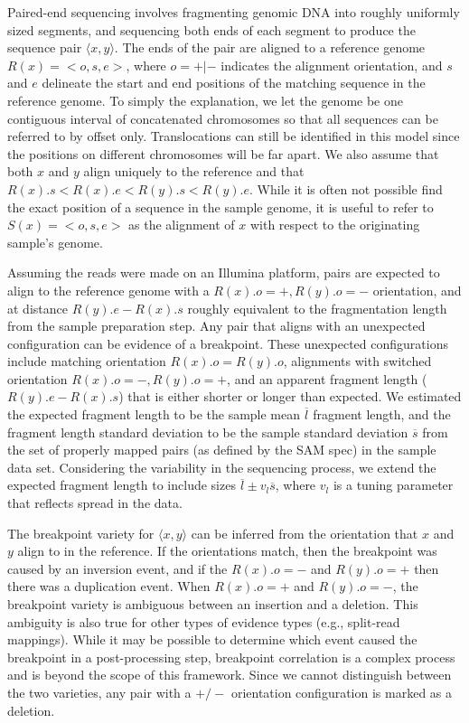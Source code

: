 \documentclass[10pt]{bmc_article}
\newenvironment{bmcformat}{\begin{raggedright}\baselineskip20pt\sloppy\setboolean{publ}{false}}{\end{raggedright}\baselineskip20pt\sloppy}
\begin{document}
\begin{bmcformat}
Paired-end sequencing involves fragmenting genomic DNA into roughly uniformly
sized segments, and sequencing both ends of each segment to produce the sequence
pair $\langle x,y \rangle$.  The ends of the pair are
aligned to a reference genome $R(x)=<o,s,e>$, where $o=+|-$ indicates the
alignment orientation, and $s$ and $e$ delineate the start and end positions of
the matching sequence in the reference genome.  To simply the explanation, we
let the genome be one contiguous interval of concatenated chromosomes so that
all sequences can be referred to by offset only.  Translocations can still be
identified in this model since the positions on different chromosomes will be
far apart.  We also assume that both $x$ and $y$ align uniquely to the
reference and that $R(x).s<R(x).e<R(y).s<R(y).e$.  While it is often not
possible find the exact position of a sequence in the sample genome, it is
useful to refer to $S(x)=<o,s,e>$ as the alignment of $x$ with respect to the
originating sample's genome.

Assuming the reads were made on an Illumina platform, pairs are expected to
align to the reference genome with a $R(x).o=+, R(y).o=-$ orientation, and at
distance $R(y).e - R(x).s$ roughly equivalent to the fragmentation length from
the sample preparation step.  Any pair that aligns with an unexpected
configuration can be evidence of a breakpoint.  These unexpected configurations
include matching orientation $R(x).o = R(y).o$, alignments with switched
orientation $R(x).o=-, R(y).o=+$, and an apparent fragment length ($R(y).e -
R(x).s$) that is either shorter or longer than expected.  We estimated the
expected fragment length to be the sample mean $\overline{l}$ fragment length,
and the fragment length standard deviation to be the sample standard deviation
$\overline{s}$ from the set of properly mapped pairs (as defined by the SAM
spec) in the sample data set.  Considering the variability in the sequencing
process, we extend the expected fragment length to include sizes
$\overline{l}\pm v_l \overline{s}$, where $v_l$ is a tuning parameter that
reflects spread in the data.

The breakpoint variety for $\langle x,y \rangle$ can be inferred from the
orientation that $x$ and $y$ align to in the reference.  If the orientations
match, then the breakpoint was caused by an inversion event, and if the
$R(x).o=-$ and $R(y).o=+$ then there was a duplication event.  When $R(x).o=+$
and $R(y).o=-$, the breakpoint variety is ambiguous between an insertion and a
deletion.  This ambiguity is also true for other types of evidence types (e.g.,
split-read mappings).  While it may be possible to determine which event caused
the breakpoint in a post-processing step, breakpoint correlation is a complex
process and is beyond the scope of this framework.  Since we cannot distinguish
between the two varieties, any pair with a $+/-$ orientation configuration is
marked as a deletion.


\end{bmcformat}
\end{document}
